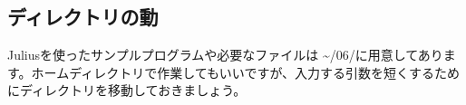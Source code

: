 \subsection{ディレクトリの動}
Juliusを使ったサンプルプログラムや必要なファイルは \textasciitilde /06/に用意してあります。ホームディレクトリで作業してもいいですが、入力する引数を短くするためにディレクトリを移動しておきましょう。\\

\begin{tcolorbox}[title=\useOmetoi]
\begin{enumerate}
\end{enumerate}
\end{tcolorbox}

